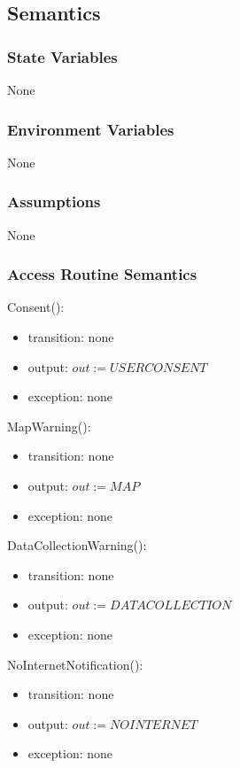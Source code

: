 \documentclass[12pt, titlepage]{article}
\begin{document}
\subsection{Semantics}

\subsubsection{State Variables}

None

\subsubsection{Environment Variables}

None

\subsubsection{Assumptions}

None

\subsubsection{Access Routine Semantics}

\noindent Consent():
\begin{itemize}
\item transition: none
\item output: $out := USERCONSENT$
\item exception: none
\end{itemize}

\noindent MapWarning():
\begin{itemize}
\item transition: none
\item output: $out := MAP$
\item exception: none
\end{itemize}

\noindent DataCollectionWarning():
\begin{itemize}
\item transition: none
\item output: $out := DATACOLLECTION$
\item exception: none
\end{itemize}

\noindent NoInternetNotification():
\begin{itemize}
\item transition: none
\item output: $out := NOINTERNET$
\item exception: none
\end{itemize}
\end{document}
